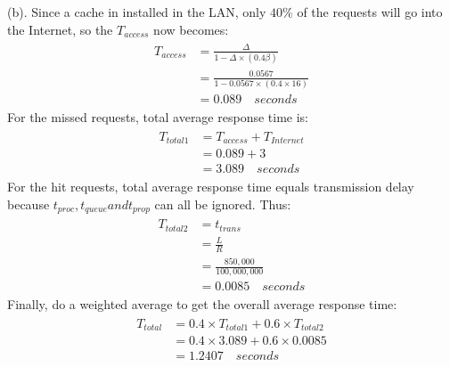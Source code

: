 \documentclass[titlepage, paper=a4, fontsize=11pt]{scrartcl} %
\numberwithin{equation}{section} %
\numberwithin{figure}{section} %
\numberwithin{table}{section} %
\begin{document}
(b). Since a cache in installed in the LAN, only $40\%$ of the requests will go into the Internet,
so the $T_{access}$ now becomes:
\begin{align*} 
\begin{split}
T_{access} &= \frac{\Delta}{1-\Delta \times (0.4\beta)} \\
&= \frac{0.0567}{1-0.0567 \times (0.4 \times 16)} \\
&= 0.089 \quad seconds
\end{split}					
\end{align*}
For the missed requests, total average response time is:
\begin{align*} 
\begin{split}
T_{total1} &= T_{access} + T_{Internet} \\
&= 0.089 + 3 \\
&= 3.089 \quad seconds
\end{split}					
\end{align*}
For the hit requests, total average response time equals transmission delay because
$t_{proc}, t_{queue} and t_{prop}$ can all be ignored. Thus:
\begin{align*} 
\begin{split}
T_{total2} &= t_{trans} \\
&= \frac{L}{R} \\
&= \frac{850,000}{100,000,000} \\
&= 0.0085 \quad seconds
\end{split}					
\end{align*}
Finally, do a weighted average to get the overall average response time:
\begin{align*} 
\begin{split}
T_{total} &= 0.4 \times T_{total1} + 0.6 \times T_{total2} \\
&= 0.4 \times 3.089 + 0.6 \times 0.0085 \\
&= 1.2407 \quad seconds
\end{split}					
\end{align*}
\\


\end{document}
